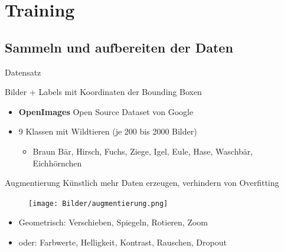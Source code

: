 \section[\thesection \  Training]{Training}\label{sec:training}
%
%


\subsection[\thesection .\thesubsection \ 
Sammeln und aufbereiten der Daten]{Sammeln und aufbereiten der Daten}\label{subsec:collect_data}
\begin{frame}{Datensatz}
   
   Bilder + Labels mit Koordinaten der Bounding Boxen

    \begin{itemize}
        \item \textbf{OpenImages} Open Source Dataset von Google
    \end{itemize}
    \begin{itemize}
        \item 9 Klassen mit Wildtieren (je 200 bis 2000 Bilder)
        \begin{itemize}
            \item Braun Bär, Hirsch, Fuchs, Ziege, Igel, Eule, Hase, Waschbär, Eichhörnchen
        \end{itemize}
    \end{itemize}
    \vspace{0.5cm}
    
\end{frame}

\begin{frame}{Augmentierung}
    Künstlich mehr Daten erzeugen, verhindern von Overfitting
        \begin{figure}
            \centering
            \texttt{[image: Bilder/augmentierung.png]}            
        \end{figure}
        \begin{itemize}
            \item Geometrisch: Verschieben, Spiegeln, Rotieren, Zoom
            \item oder: Farbwerte, Helligkeit, Kontrast, Rauschen, Dropout
        \end{itemize}

\end{frame}

